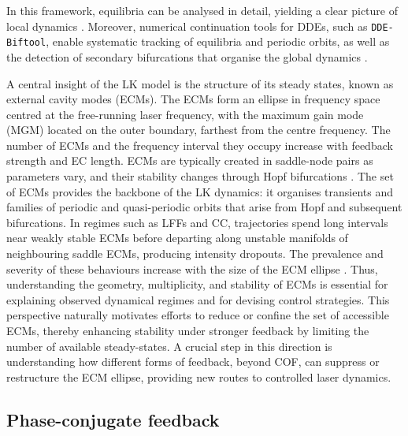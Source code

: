 In this framework, equilibria can be analysed in detail, yielding a clear picture of local dynamics \cite{rottschafer2007ecm}.
Moreover, numerical continuation tools for DDEs, such as \texttt{DDE-Biftool}, enable systematic tracking of equilibria and periodic orbits, as well as the detection of secondary bifurcations that organise the global dynamics \cite{sieber2014dde, krauskopf2004dynamics}.
%
\par
%
A central insight of the LK model is the structure of its steady states, known as external cavity modes (ECMs).
The ECMs form an ellipse in frequency space centred at the free-running laser frequency, with the maximum gain mode (MGM) located on the outer boundary, farthest from the centre frequency.
The number of ECMs and the frequency interval they occupy increase with feedback strength and EC length. 
ECMs are typically created in saddle-node pairs as parameters vary, and their stability changes through Hopf bifurcations \cite{heil2003delay, rottschafer2007ecm}.
The set of ECMs provides the backbone of the LK dynamics: it organises transients and families of periodic and quasi-periodic orbits that arise from Hopf and subsequent bifurcations.
In regimes such as LFFs and CC, trajectories spend long intervals near weakly stable ECMs before departing along unstable manifolds of neighbouring saddle ECMs, producing intensity dropouts. 
The prevalence and severity of these behaviours increase with the size of the ECM ellipse \cite{heil2003delay, krauskopf2004dynamics}.
Thus, understanding the geometry, multiplicity, and stability of ECMs is essential for explaining observed dynamical regimes and for devising control strategies.
This perspective naturally motivates efforts to reduce or confine the set of accessible ECMs, thereby enhancing stability under stronger feedback by limiting the number of available steady-states.
A crucial step in this direction is understanding how different forms of feedback, beyond COF, can suppress or restructure the ECM ellipse, providing new routes to controlled laser dynamics.
%
%
\subsection*{Phase-conjugate feedback}
\label{subsec:PCF}

